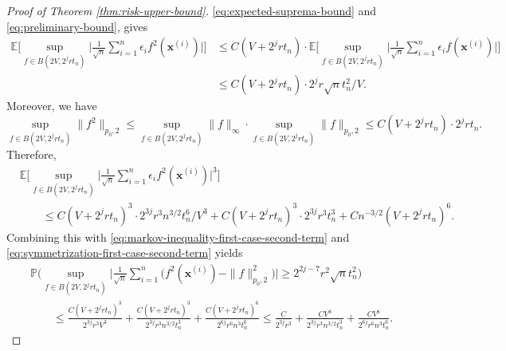 \documentclass[10pt]{article}
\newcommand{\E}{{\mathbb E}}
\renewcommand{\P}{{\mathbb P}}
\newcommand{\xbf}{{\mathbf{x}}}
\begin{document}
\begin{proof}[Proof of Theorem \ref{thm:risk-upper-bound}]
\eqref{eq:expected-suprema-bound} and
\eqref{eq:preliminary-bound}, gives
\begin{equation*}
\begin{aligned}
    \E\Big[\sup_{f \in B(2V, 2^j r t_n)} 
    \Big|\frac{1}{\sqrt{n}} \sum_{i = 1}^{n} \epsilon_i f^2(\xbf^{(i)}) 
    \Big| \Big] 
    &\le C (V + 2^j r t_n) \cdot 
    \E\Big[\sup_{f \in B(2V, 2^j r t_n)} 
    \Big|\frac{1}{\sqrt{n}} \sum_{i = 1}^{n} \epsilon_i f(\xbf^{(i)}) 
    \Big| \Big] \\
    &\le C(V + 2^j r t_n) \cdot 2^j r \sqrt{n} t_n^2 / V.
\end{aligned}
\end{equation*}
Moreover, we have 
\begin{equation*}
    \sup_{f \in B(2V, 2^j r t_n)} \|f^2\|_{p_0, 2} 
    \le \sup_{f \in B(2V, 2^j r t_n)} \|f\|_{\infty} \cdot
    \sup_{f \in B(2V, 2^j r t_n)} \|f\|_{p_0, 2}  
    \le C(V + 2^j r t_n) \cdot 2^j r t_n.
\end{equation*}
Therefore,
\begin{equation*}
\begin{aligned}
    &\E\Big[\sup_{f \in B(2V, 2^j r t_n)} 
    \Big|\frac{1}{\sqrt{n}} \sum_{i = 1}^{n} \epsilon_i f^2(\xbf^{(i)}) 
    \Big|^3 \Big] \\ 
    &\qquad \le 
    C(V + 2^j r t_n)^3 \cdot 2^{3j} r^3 n^{3/2} t_n^6 / V^3
    + C(V + 2^j r t_n)^3 \cdot 2^{3j} r^3 t_n^3 
    + Cn^{-3/2}(V + 2^j r t_n)^6.
\end{aligned}
\end{equation*}
Combining this with \eqref{eq:markov-inequality-first-case-second-term} and 
\eqref{eq:symmetrization-first-case-second-term} yields
\begin{equation*}
\begin{aligned}
    &\P\Big(\sup_{f \in B(2V, 2^j r t_n)} 
    \Big|\frac{1}{\sqrt{n}} \sum_{i = 1}^{n} \big(f^2(\xbf^{(i)}) 
    -\|f\|_{p_0, 2}^2\big) \Big| \ge 2^{2j - 7} r^2 \sqrt{n}t_n^2 \Big) \\
    &\qquad \le \frac{C(V + 2^j r t_n)^3}{2^{3j} r^3 V^3} 
    + \frac{C(V + 2^j r t_n)^3}{2^{3j} r^3 n^{3/2} t_n^3} 
    + \frac{C(V + 2^j r t_n)^6}{2^{6j} r^6 n^3 t_n^6} 
    \le \frac{C}{2^{3j} r^3} 
    + \frac{CV^3}{2^{3j} r^3 n^{3/2} t_n^3} 
    + \frac{CV^6}{2^{6j} r^6 n^3 t_n^6}.
\end{aligned}
\end{equation*}
    

\end{proof}
\end{document}
